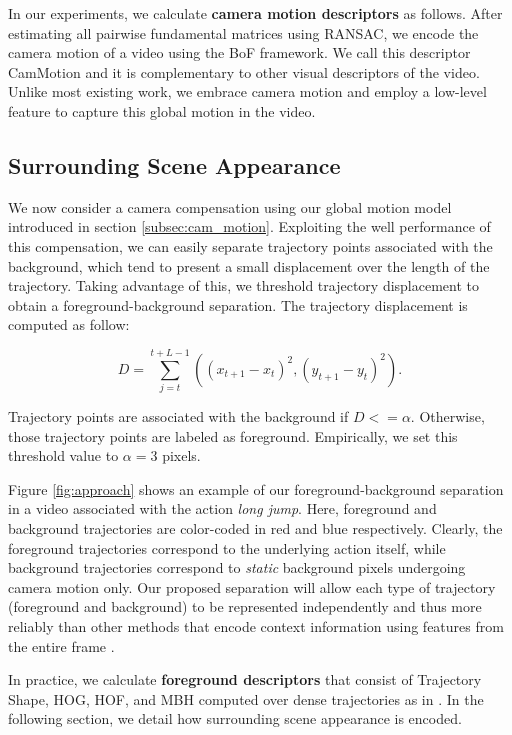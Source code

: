 \documentclass[runningheads]{llncs}
\begin{document}
In our experiments, we calculate \textbf{camera motion descriptors} as follows. After estimating all pairwise fundamental matrices using RANSAC, we encode the camera motion of a video using the BoF framework. We call this descriptor CamMotion and it is complementary to other visual descriptors of the video. Unlike most existing work, we embrace camera motion and employ a low-level feature to capture this global motion in the video.
\subsection{Surrounding Scene Appearance}
We now consider a camera compensation using our global motion model introduced in section \ref{subsec:cam_motion}. Exploiting the well performance of this compensation, we can easily separate trajectory points associated with the background, which tend to present a small displacement over the length of the trajectory. Taking advantage of this, we threshold trajectory displacement to obtain a foreground-background separation. The trajectory displacement is computed as follow:

\begin{equation}
D = \sum _{j=t}^{t+L-1}\left ( (x_{t+1}-x_t)^2, (y_{t+1}-y_t)^2 \right ).
\end{equation}

Trajectory points are associated with the background if $D<=\alpha$. Otherwise, those trajectory points are labeled as foreground. Empirically, we set this threshold value to $\alpha=3$ pixels.

Figure \ref{fig:approach} shows an example of our foreground-background separation in a video associated with the action \textit{long jump}. Here, foreground and background trajectories are color-coded in red and blue respectively. Clearly, the foreground trajectories correspond to the underlying action itself, while background trajectories correspond to \emph{static} background pixels undergoing camera motion only. Our proposed separation will allow each type of trajectory (foreground and background) to be represented independently and thus more reliably than other methods that encode context information using features from the entire frame \cite{marszalek2009}.

In practice, we calculate \textbf{foreground descriptors} that consist of Trajectory Shape, HOG, HOF, and MBH computed over dense trajectories as in \cite{wang2013}. In the following section, we detail how surrounding scene appearance is encoded.
\end{document}
